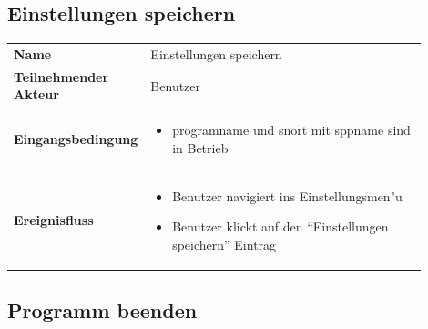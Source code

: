\subsection{Einstellungen speichern}

\begin{tabular}{lp{0.9\linewidth}}
\textbf{Name} & Einstellungen speichern \\

\textbf{Teilnehmender Akteur} & Benutzer \\

\textbf{Eingangsbedingung} &
				\begin{minipage}[t]{\linewidth}
				\begin{itemize}[nosep,after=\strut,leftmargin=10pt]

				\item \gls{programname} und \gls{snort} mit \gls{sppname} sind in Betrieb

				\end{itemize}
				\end{minipage} \\
\textbf{Ereignisfluss} &
				\begin{minipage}[t]{\linewidth}
				\begin{itemize}[nosep,after=\strut,leftmargin=10pt]
				\item Benutzer navigiert ins Einstellungsmen"u
				\item Benutzer klickt auf den ``Einstellungen speichern'' Eintrag
				\end{itemize}
				\end{minipage} \\
\end{tabular}

\subsection{Programm beenden}

